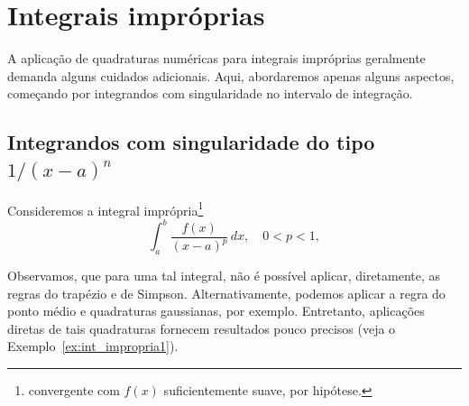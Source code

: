 
\section{Integrais impróprias}

A aplicação de quadraturas numéricas para integrais impróprias geralmente demanda alguns cuidados adicionais. Aqui, abordaremos apenas alguns aspectos, começando por integrandos com singularidade no intervalo de integração.

\subsection{Integrandos com singularidade do tipo $1/(x-a)^n$}

Consideremos a integral imprópria\footnote{convergente com $f(x)$ suficientemente suave, por hipótese.}
\begin{equation}
  \int_a^b\frac{f(x)}{(x-a)^p}\,dx, \quad 0<p<1,
\end{equation}

Observamos, que para uma tal integral, não é possível aplicar, diretamente, as regras do trapézio e de Simpson. Alternativamente, podemos aplicar a regra do ponto médio e quadraturas gaussianas, por exemplo. Entretanto, aplicações diretas de tais quadraturas fornecem resultados pouco precisos (veja o Exemplo~\ref{ex:int_impropria1}).

